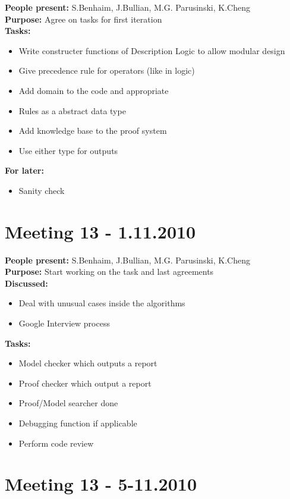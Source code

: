 \documentclass[12pt]{article}
\begin{document}
\textbf{People present:} S.Benhaim, J.Bullian, M.G. Parusinski, K.Cheng \\
\textbf{Purpose:} Agree on tasks for first iteration \\
\textbf{Tasks:} \\ 
\begin{itemize}
\item Write constructer functions of Description Logic to allow modular design
\item Give precedence rule for operators (like in logic)
\item Add domain to the code and appropriate
\item Rules as a abstract data type
\item Add knowledge base to the proof system
\item Use either type for outputs
\end{itemize}
\textbf{For later:}
\begin{itemize}
\item Sanity check
\end{itemize}

\section*{Meeting 13 - 1.11.2010}

\textbf{People present:} S.Benhaim, J.Bullian, M.G. Parusinski, K.Cheng \\
\textbf{Purpose:} Start working on the task and last agreements \\
\textbf{Discussed:}
\begin{itemize}
\item Deal with unusual cases inside the algorithms
\item Google Interview process
\end{itemize}
\textbf{Tasks:}
\begin{itemize}
\item Model checker which outputs a report
\item Proof checker which output a report
\item Proof/Model searcher done
\item Debugging function if applicable
\item Perform code review
\end{itemize}

\section*{Meeting 13 - 5-11.2010}
\end{document}
